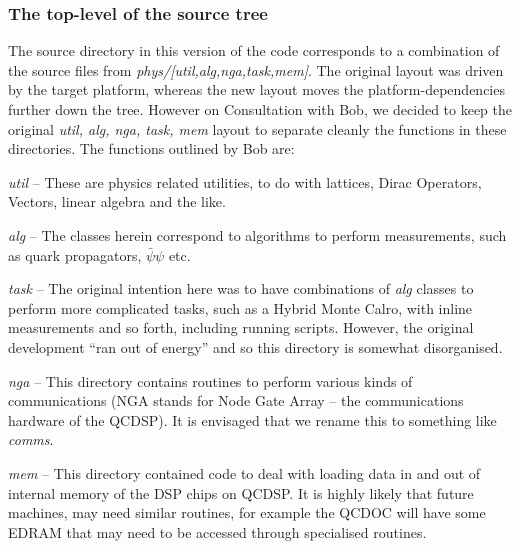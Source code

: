 \documentclass[12pt]{article}
\begin{document}
\subsubsection{The top-level of the source tree}
The source directory in this version of the code corresponds to a combination of the 
source files from \emph{phys/[util,alg,nga,task,mem]}.  The original layout
was driven by the target platform, whereas the new layout moves the
platform-dependencies further down the tree. However on Consultation with 
Bob, we decided to keep the original \emph{util, alg, nga, task, mem}
layout to separate cleanly the functions in these directories. The 
functions outlined by Bob are:
\begin{description}
\setlength{\itemsep}{0.0cm}
 \item{\emph{util}} -- These are physics related utilities, to do with
lattices, Dirac Operators, Vectors, linear algebra and the like.
 \item{\emph{alg}} -- The classes herein correspond to algorithms to 
perform measurements, such as quark propagators, $\bar{\psi}\psi$ etc.
 \item{\emph{task}} -- The original intention here was to have combinations
of \emph{alg} classes to perform more complicated tasks, such as a Hybrid Monte Calro, with inline measurements and so forth, including running scripts. However, the original development ``ran out of energy'' and so this directory is 
somewhat disorganised.
 \item{\emph{nga}} -- This directory contains routines to perform various 
kinds of communications (NGA stands for Node Gate Array -- the communications hardware of the QCDSP). It is envisaged that we rename this to something like \emph{comms}.
 \item{\emph{mem}} -- This directory contained code to deal with loading 
data in and out of internal memory of the DSP chips on QCDSP. It is highly
likely that future machines, may need similar routines, for example the 
QCDOC will have some EDRAM that may need to be accessed through specialised
routines.
\end{description}
\end{document}
